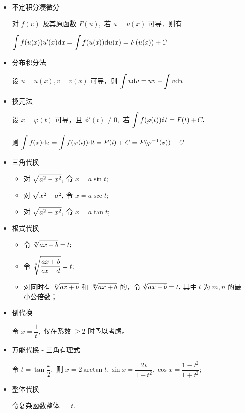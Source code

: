 \begin{itemize}
    \item 不定积分凑微分
    
    对 $ f(u) $ 及其原函数 $ F(u), $ 若 $ u = u(x) $ 可导，则有
    
    $ \displaystyle \int f(u(x))u'(x)\mathrm{d}x = \int f(u(x))\mathrm{d}u(x) = F(u(x)) + C $ 
    \item 分布积分法
    
    设 $ u = u(x), v = v(x) $ 可导，则 $ \displaystyle \int u\mathrm{d}v = uv - \int v\mathrm{d}u $ 
    \item 换元法
    
    设 $ x = \varphi(t) $ 可导，且 $ \phi'(t) \neq 0, $ 
    若 $ \displaystyle \int f(\varphi(t))\mathrm{d}t = F(t) + C, $

    则 $ \displaystyle \int f(x)\mathrm{d}x = \int f(\varphi(t))\mathrm{d}t = F(t) + C = F(\varphi^{-1}(x)) + C $ 
    \item 三角代换
    \begin{itemize}
        \item 对 $ \displaystyle\sqrt{a^2 - x^2}, $ 令 $ x = a\sin t; $ 
        \item 对 $ \displaystyle\sqrt{x^2 - a^2}, $ 令 $ x = a\sec t; $ 
        \item 对 $ \displaystyle\sqrt{a^2 + x^2}, $ 令 $ x = a\tan t; $ 
    \end{itemize}
    \item 根式代换
    \begin{itemize}
        \item 令 $ \displaystyle\sqrt[n]{ax+b} = t; $ 
        \item 令 $ \displaystyle\sqrt[n]{\dfrac{ax+b}{cx+d}} = t; $ 
        \item 对同时有 $ \displaystyle\sqrt[n]{ax+b} $ 和 $ \displaystyle\sqrt[m]{ax+b} $ 的，令
        $ \displaystyle\sqrt[l]{ax+b} = t, $ 其中 $ l $ 为 $ m,n $ 的最小公倍数；
    \end{itemize}
    \item 倒代换
    
    令 $ x = \dfrac{1}{t}, $ 仅在系数 $ \geq 2 $ 时予以考虑。
    \item 万能代换 - 三角有理式
    
    令 $ t = \tan \dfrac{x}{2}, $ 则 $ x = 2\arctan t, \sin x = \dfrac{2t}{1+t^2}, 
    \cos x = \dfrac{1-t^2}{1+t^2}; $
    \item 整体代换
    
    令复杂函数整体 $  = t. $ 
\end{itemize}



